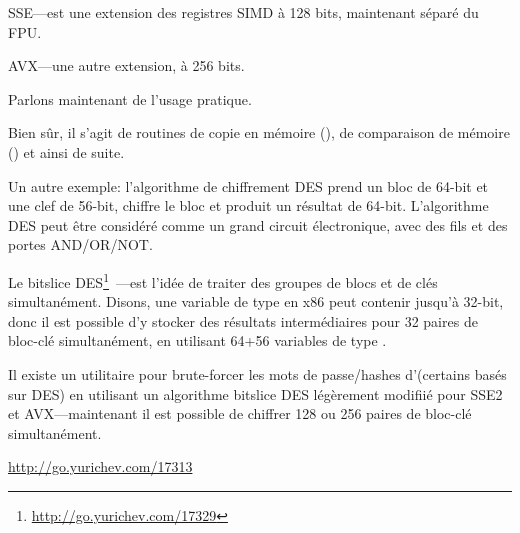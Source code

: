 SSE---est une extension des registres SIMD à 128 bits, maintenant séparé du FPU.

AVX---une autre extension, à 256 bits.

Parlons maintenant de l'usage pratique.

Bien sûr, il s'agit de routines de copie en mémoire (), de comparaison
de mémoire () et ainsi de suite.


Un autre exemple: l'algorithme de chiffrement DES prend un bloc de 64-bit et une
clef de 56-bit, chiffre le bloc et produit un résultat de 64-bit.
L'algorithme DES peut être considéré comme un grand circuit électronique, avec des
fils et des portes AND/OR/NOT.

\label{bitslicedes}
\newcommand{\URLBS}{\url{http://go.yurichev.com/17329}}

Le bitslice DES\footnote{\URLBS}~---est l'idée de traiter des groupes de blocs et
de clés simultanément.
Disons, une variable de type  en x86 peut contenir jusqu'à 32-bit,
donc il est possible d'y stocker des résultats intermédiaires pour 32 paires de bloc-clé
simultanément, en utilisant 64+56 variables de type .

\myindex{\oracle}
Il existe un utilitaire pour brute-forcer les mots de passe/hashes d'\oracle (certains
basés sur DES) en utilisant un algorithme bitslice DES légèrement modifiié pour SSE2
et AVX---maintenant il est possible de chiffrer 128 ou 256 paires de bloc-clé simultanément.

\url{http://go.yurichev.com/17313}




